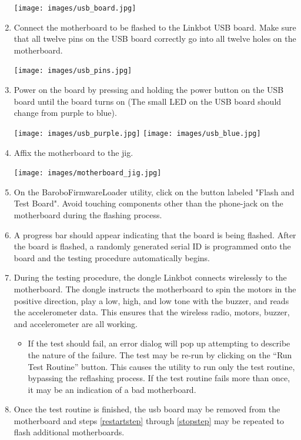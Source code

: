 \documentclass{article}
\begin{document}
\begin{enumerate}
   \begin{center}
   \texttt{[image: images/usb\_board.jpg]}
   \end{center}

\item \label{restartstep}Connect the motherboard to be flashed to the Linkbot USB board. Make sure
   that all twelve pins on the USB board correctly go into all twelve holes on
   the motherboard.

   \begin{center}
   \texttt{[image: images/usb\_pins.jpg]}
   \end{center}

\item Power on the board by pressing and holding the power button on the USB board
   until the board turns on (The small LED on the USB board should change from
   purple to blue).

   \begin{center}
   \texttt{[image: images/usb\_purple.jpg]}
   \texttt{[image: images/usb\_blue.jpg]}
   \end{center}

\item Affix the motherboard to the jig. 

   \begin{center}
   \texttt{[image: images/motherboard\_jig.jpg]}
   \end{center}

\item On the BaroboFirmwareLoader utility, click on the button labeled "Flash
  and Test Board". Avoid touching components other than the phone-jack on the
  motherboard during the flashing process.
\item A progress bar should appear indicating that the board is being flashed. 
  After the board is flashed, a randomly generated serial ID is programmed onto 
  the board and the testing procedure automatically begins.
\item During the testing procedure, the dongle Linkbot connects wirelessly to
  the motherboard. The dongle instructs the motherboard to spin the motors in the
  positive direction, play a low, high, and low tone with the buzzer, and reads
  the accelerometer data. This ensures that the wireless radio, motors, buzzer, and
  accelerometer are all working.
  \begin{itemize}
    \item If the test should fail, an error dialog will pop up attempting to
    describe the nature of the failure. The test may be re-run by clicking on
    the ``Run Test Routine'' button. This causes the utility to run only the
    test routine, bypassing the reflashing process. If the test routine fails
    more than once, it may be an indication of a bad motherboard.
  \end{itemize}
\item \label{stopstep} Once the test routine is finished, the usb board may be removed from the
  motherboard and steps \ref{restartstep} through
  \ref{stopstep} may be repeated to flash additional motherboards.
\end{enumerate}
\end{document}
